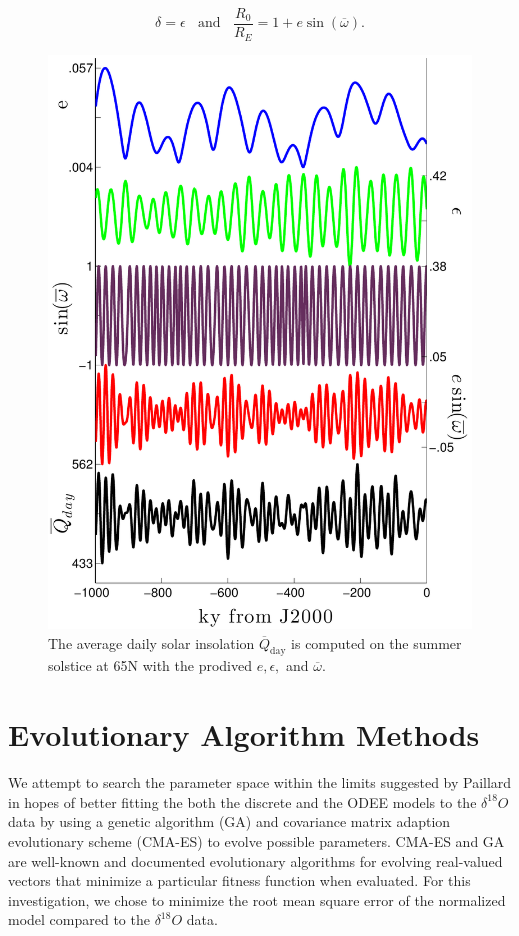 $$ \delta = \epsilon ~~~~\text{and} ~~~~ \frac{R_0}{R_E} = 1 + e\sin (\overline {\omega}) .$$

\begin{figure}[tpb!]
\centering
  \includegraphics[width=.48\textwidth]{../data/insolation/laskar2004/insol_data2_noname.pdf}
  \caption{
    The average daily solar insolation $\overline{Q}_{\text{day}}$ is computed on the summer solstice at 65N with the prodived $e,\epsilon,$ and $\overline{\omega}$.
  }
  \label{fig:insol-data}
\end{figure}


\section{Evolutionary Algorithm Methods}

\newcommand{\bb}[1]{\mathbb{#1}}
\newcommand{\DO}{$\delta^{18}O$ }

We attempt to search the parameter space within the limits suggested by Paillard \cite{paillard1998timing} in hopes of better fitting the both the discrete and the ODEE models to the \DO data by using a genetic algorithm (GA) and covariance matrix adaption evolutionary scheme (CMA-ES) to evolve possible parameters. CMA-ES and GA are well-known and documented evolutionary algorithms for evolving real-valued vectors that minimize a particular fitness function when evaluated.
For this investigation, we chose to minimize the root mean square error of the normalized model compared to the \DO data.

